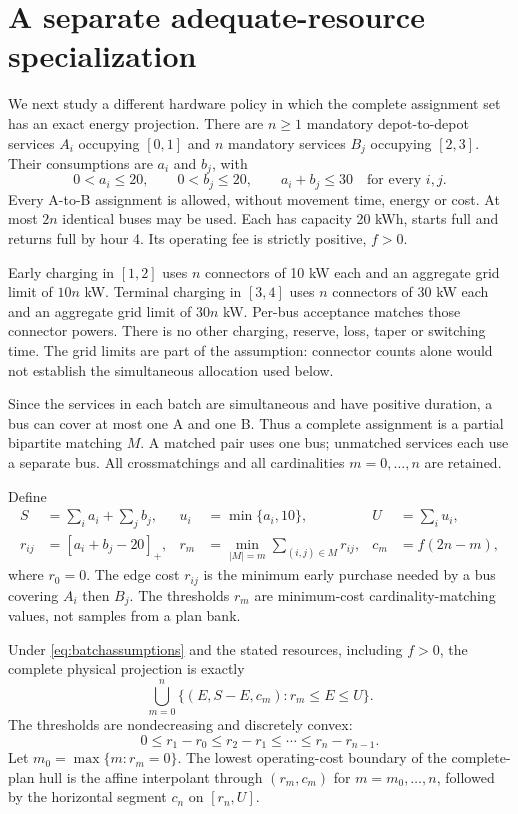 \section{A separate adequate-resource specialization}\label{app:adequate_resources}
We next study a different hardware policy in which the complete assignment set has an exact
energy projection. There are $n\ge1$ mandatory depot-to-depot services
$A_i$ occupying $[0,1]$ and $n$ mandatory services $B_j$ occupying $[2,3]$.
Their consumptions are $a_i$ and $b_j$, with
\begin{equation}\label{eq:batchassumptions}
 0<a_i\le20,\qquad0<b_j\le20,\qquad a_i+b_j\le30
 \quad\text{for every }i,j.
\end{equation}
Every A-to-B assignment is allowed, without movement time, energy or cost.
At most $2n$ identical buses may be used. Each has capacity 20 kWh,
starts full and returns full by hour 4. Its operating fee is strictly
positive, $f>0$.

Early charging in $[1,2]$ uses $n$ connectors of 10 kW each and an
aggregate grid limit of $10n$ kW. Terminal charging in $[3,4]$ uses $n$
connectors of 30 kW each and an aggregate grid limit of $30n$ kW. Per-bus
acceptance matches those connector powers. There is no other charging,
reserve, loss, taper or switching time. The grid limits are part of the
assumption: connector counts alone would not establish the simultaneous
allocation used below.

Since the services in each batch are simultaneous and have positive duration,
a bus can cover at most one A and one B. Thus a complete assignment is a
partial bipartite matching $M$. A matched pair uses one bus; unmatched
services each use a separate bus. All crossmatchings and all cardinalities
$m=0,\ldots,n$ are retained.

Define
\begin{align}
 S&=\sum_i a_i+\sum_j b_j,&u_i&=\min\{a_i,10\},&U&=\sum_i u_i,\\
 r_{ij}&=[a_i+b_j-20]_+,&
 r_m&=\min_{|M|=m}\sum_{(i,j)\in M}r_{ij},&c_m&=f(2n-m),
\end{align}
where $r_0=0$. The edge cost $r_{ij}$ is the minimum early purchase
needed by a bus covering $A_i$ then $B_j$. The thresholds $r_m$ are
minimum-cost cardinality-matching values, not samples from a plan bank.

\begin{theorem}\label{thm:batchprojection}
Under \eqref{eq:batchassumptions} and the stated resources, including $f>0$,
the complete physical projection is exactly
\begin{equation}\label{eq:batchprojection}
 \bigcup_{m=0}^n\{(E,S-E,c_m):r_m\le E\le U\}.
\end{equation}
The thresholds are nondecreasing and discretely convex:
\begin{equation}\label{eq:discreteconvex}
 0\le r_1-r_0\le r_2-r_1\le\cdots\le r_n-r_{n-1}.
\end{equation}
Let $m_0=\max\{m:r_m=0\}$. The lowest operating-cost boundary of the
complete-plan hull is the affine interpolant through
$(r_m,c_m)$ for $m=m_0,\ldots,n$, followed by the horizontal segment
$c_n$ on $[r_n,U]$.
\end{theorem}

